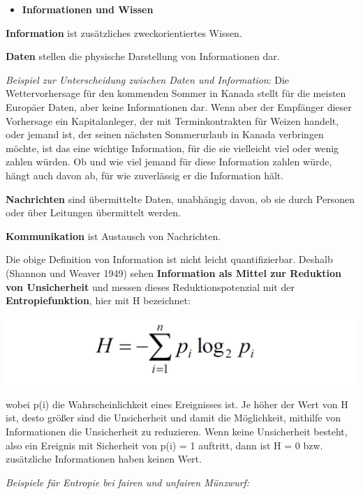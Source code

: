 \documentclass[]{article}
\providecommand{\tightlist}{%
  \setlength{\itemsep}{0pt}\setlength{\parskip}{0pt}}
\begin{document}
\begin{itemize}
\tightlist
\item
  \textbf{Informationen und Wissen}
\end{itemize}

\textbf{Information} ist zusätzliches zweckorientiertes Wissen.

\textbf{Daten} stellen die physische Darstellung von Informationen dar.

\emph{Beispiel zur Unterscheidung zwischen Daten und Information}: Die
Wettervorhersage für den kommenden Sommer in Kanada stellt für die
meisten Europäer Daten, aber keine Informationen dar. Wenn aber der
Empfänger dieser Vorhersage ein Kapitalanleger, der mit Terminkontrakten
für Weizen handelt, oder jemand ist, der seinen nächsten Sommerurlaub in
Kanada verbringen möchte, ist das eine wichtige Information, für die sie
vielleicht viel oder wenig zahlen würden. Ob und wie viel jemand für
diese Information zahlen würde, hängt auch davon ab, für wie zuverlässig
er die Information hält.

\textbf{Nachrichten} sind übermittelte Daten, unabhängig davon, ob sie
durch Personen oder über Leitungen übermittelt werden.

\textbf{Kommunikation} ist Austausch von Nachrichten.

Die obige Definition von Information ist nicht leicht quantifizierbar.
Deshalb (Shannon und Weaver 1949) sehen \textbf{Information als Mittel
zur Reduktion von Unsicherheit} und messen dieses Reduktionspotenzial
mit der \textbf{Entropiefunktion}, hier mit H bezeichnet:

\includegraphics{img/1_1 Entropie.png}

wobei p(i) die Wahrscheinlichkeit eines Ereignisses ist. Je höher der
Wert von H ist, desto größer sind die Unsicherheit und damit die
Möglichkeit, mithilfe von Informationen die Unsicherheit zu reduzieren.
Wenn keine Unsicherheit besteht, also ein Ereignis mit Sicherheit von
p(i) = 1 auftritt, dann ist H = 0 bzw. zusätzliche Informationen haben
keinen Wert.

\emph{Beispiele für Entropie bei fairen und unfairen Münzwurf:}
\end{document}
